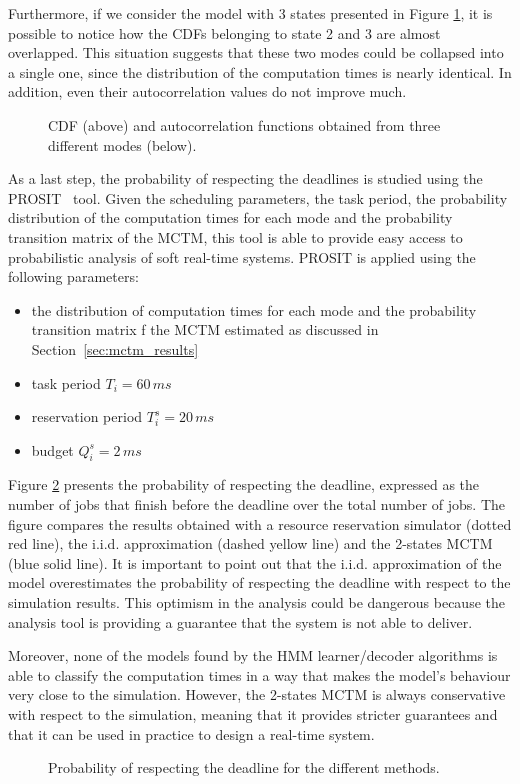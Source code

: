 Furthermore, if we consider the model with 3 states presented in Figure
\ref{img:mctm_3_states}, it is possible to notice how the CDFs belonging to state
2 and 3 are almost overlapped. This situation suggests that these two
modes could be collapsed into a single one, since the distribution of the
computation times is nearly identical. In addition, even their autocorrelation
values do not improve much.
\begin{figure}[!htb]
    \caption{CDF (above) and autocorrelation functions obtained from three
        different modes (below).}
    \label{img:mctm_3_states}
\end{figure}

As a last step, the probability of respecting the deadlines is studied using the
PROSIT~\cite{palopoli2014tool} tool. Given the scheduling parameters, the task period, the
probability distribution of the computation times for each mode and the probability transition matrix of the MCTM, this tool is able to provide easy
access to probabilistic analysis of soft real-time systems. PROSIT is applied using
the following parameters:
\begin{itemize}
    \item the distribution of computation times for each mode and the probability transition matrix f the MCTM estimated as discussed in Section~\ref{sec:mctm_results}
    \item task period \( T_i = 60\,ms \)
    \item reservation period \( T_{i}^s = 20\,ms \)
    \item budget \( Q_{i}^s = 2\,ms \)
\end{itemize}

Figure \ref{img:deadline_comparison} presents the probability of respecting the deadline, expressed as the number of jobs that finish before the deadline over the total number of jobs. The figure compares the results obtained with a resource reservation simulator (dotted red line), the i.i.d.
approximation (dashed yellow line)  and the 2-states MCTM (blue solid line). It is important to point out that the i.i.d. approximation of the model overestimates the probability of respecting
the deadline with respect to the simulation results. This optimism in the analysis could be dangerous because the analysis tool is providing a guarantee that the system is not able to deliver.

Moreover, none of the models found by the HMM learner/decoder algorithms is able
to classify the computation times in a way that makes the model's behaviour very
close to the simulation. However, the 2-states MCTM is always conservative
with respect to the simulation, meaning that it provides stricter guarantees and
that it can be used in practice to design a real-time system.
\begin{figure}[!htb]
    \caption{Probability of respecting the deadline for the different methods.}
    \label{img:deadline_comparison}
\end{figure}
